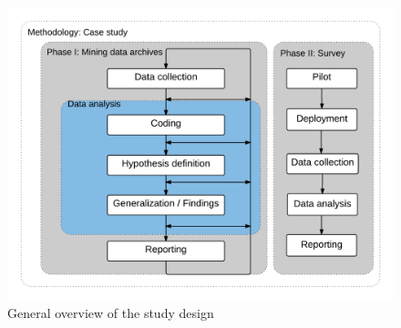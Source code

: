 \documentclass{sig-alternate-05-2015}
\begin{document}
%
%
%

	\begin{figure} [!ht]
		\centering
		\includegraphics[width=\columnwidth]{Figures/StudyPhases}
		\caption{General overview of the study design}
		\label{fig:StudyPhases}
	\end{figure}
\end{document}
